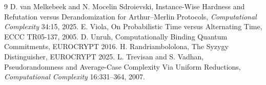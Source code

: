 \documentclass[11pt]{article}
\begin{document}
\begin{thebibliography}{9}
 D. van Melkebeek and N. Mocelin Sdroievski, Instance-Wise Hardness and Refutation versus Derandomization for Arthur--Merlin Protocols, \emph{Computational Complexity} 34:15, 2025.
 E. Viola, On Probabilistic Time versus Alternating Time, ECCC TR05-137, 2005.
 D. Unruh, Computationally Binding Quantum Commitments, EUROCRYPT 2016.
 H. Randriambololona, The Syzygy Distinguisher, EUROCRYPT 2025.
 L. Trevisan and S. Vadhan, Pseudorandomness and Average-Case Complexity Via Uniform Reductions, \emph{Computational Complexity} 16:331--364, 2007.
\end{thebibliography}
\end{document}
